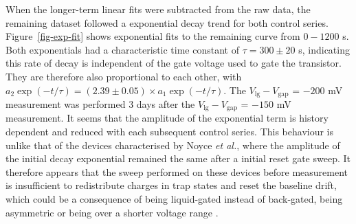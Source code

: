 \documentclass[
  a4paper,
]{scrbook}
\begin{document}
When the longer-term linear fits were subtracted from the raw data, the
remaining dataset followed a exponential decay trend for both control
series. Figure~\ref{fig-exp-fit} shows exponential fits to the remaining
curve from \(0-1200\) s. Both exponentials had a characteristic time
constant of \(\tau = 300 \pm 20\) s, indicating this rate of decay is
independent of the gate voltage used to gate the transistor. They are
therefore also proportional to each other, with
\(a_{2}\exp(-t/\tau) = (2.39\pm0.05)\times a_{1}\exp(-t/\tau)\). The
\(V_{\textrm{lg}}-V_{\textrm{gap}}\) = \(-200\) mV measurement was
performed 3 days after the \(V_{\textrm{lg}}-V_{\textrm{gap}}\) =
\(-150\) mV measurement. It seems that the amplitude of the exponential
term is history dependent and reduced with each subsequent control
series. This behaviour is unlike that of the devices characterised by
Noyce \emph{et al.}, where the amplitude of the initial decay
exponential remained the same after a initial reset gate sweep. It
therefore appears that the sweep performed on these devices before
measurement is insufficient to redistribute charges in trap states and
reset the baseline drift, which could be a consequence of being
liquid-gated instead of back-gated, being asymmetric or being over a
shorter voltage range \autocite{Noyce2019}.
\end{document}
